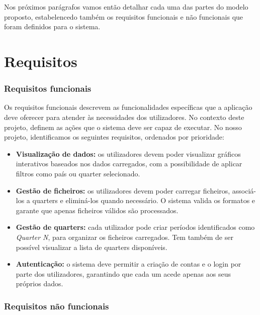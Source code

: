Nos próximos parágrafos vamos então detalhar cada uma das partes do modelo proposto, estabelencedo também os requisitos funcionais e não funcionais que foram definidos para o sistema.

\section{Requisitos}
\label{sec:requisitos}

\subsubsection{Requisitos funcionais}
Os requisitos funcionais descrevem as funcionalidades específicas que a aplicação deve oferecer para atender às necessidades dos utilizadores. No contexto deste projeto, definem as ações que o sistema deve ser capaz de executar. No nosso projeto, identificamos os seguintes requisitos, ordenados por prioridade:

\begin{itemize}
    \item \textbf{Visualização de dados:} os utilizadores devem poder visualizar gráficos interativos baseados nos dados carregados, com a possibilidade de aplicar filtros como país ou quarter selecionado.

    \item \textbf{Gestão de ficheiros:} os utilizadores devem poder carregar ficheiros, associá-los a quarters e eliminá-los quando necessário. O sistema valida os formatos e garante que apenas ficheiros válidos são processados.
    
    \item \textbf{Gestão de quarters:} cada utilizador pode criar períodos identificados como \textit{Quarter N}, para organizar os ficheiros carregados. Tem também de ser possível visualizar a lista de quarters disponíveis.

    \item \textbf{Autenticação:} o sistema deve permitir a criação de contas e o login por parte dos utilizadores, garantindo que cada um acede apenas aos seus próprios dados.
    
\end{itemize}

\subsubsection{Requisitos não funcionais}

